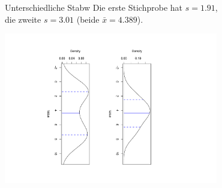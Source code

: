 \begin{frame}
  {Unterschiedliche Stabw}
  Die erste Stichprobe hat $s=1.91$,\\
  die zweite $s=3.01$ (beide $\bar{x}=4.389$).
  \vspace{-2cm}
  \begin{center}
    \includegraphics[width=0.7\textwidth,angle=90]{graphics/stdevs}
  \end{center}
\end{frame}


